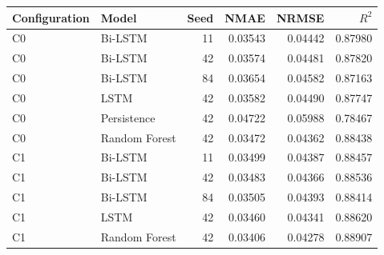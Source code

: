 \begin{tabular}{llrrrr}
\toprule
Configuration & Model & Seed & NMAE & NRMSE & $R^2$ \\
\midrule
C0 & Bi-LSTM & 11 & 0.03543 & 0.04442 & 0.87980 \\
C0 & Bi-LSTM & 42 & 0.03574 & 0.04481 & 0.87820 \\
C0 & Bi-LSTM & 84 & 0.03654 & 0.04582 & 0.87163 \\
C0 & LSTM & 42 & 0.03582 & 0.04490 & 0.87747 \\
C0 & Persistence & 42 & 0.04722 & 0.05988 & 0.78467 \\
C0 & Random Forest & 42 & 0.03472 & 0.04362 & 0.88438 \\
C1 & Bi-LSTM & 11 & 0.03499 & 0.04387 & 0.88457 \\
C1 & Bi-LSTM & 42 & 0.03483 & 0.04366 & 0.88536 \\
C1 & Bi-LSTM & 84 & 0.03505 & 0.04393 & 0.88414 \\
C1 & LSTM & 42 & 0.03460 & 0.04341 & 0.88620 \\
C1 & Random Forest & 42 & 0.03406 & 0.04278 & 0.88907 \\
\bottomrule
\end{tabular}
